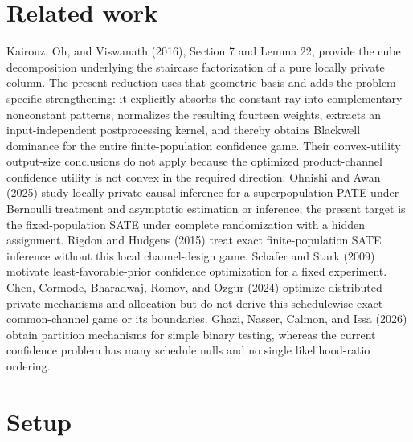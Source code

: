 \documentclass{article}
\begin{document}
\section{Related work}

Kairouz, Oh, and Viswanath (2016), Section 7 and Lemma 22, provide the cube decomposition underlying the staircase factorization of a pure locally private column. The present reduction uses that geometric basis and adds the problem-specific strengthening: it explicitly absorbs the constant ray into complementary nonconstant patterns, normalizes the resulting fourteen weights, extracts an input-independent postprocessing kernel, and thereby obtains Blackwell dominance for the entire finite-population confidence game. Their convex-utility output-size conclusions do not apply because the optimized product-channel confidence utility is not convex in the required direction. Ohnishi and Awan (2025) study locally private causal inference for a superpopulation PATE under Bernoulli treatment and asymptotic estimation or inference; the present target is the fixed-population SATE under complete randomization with a hidden assignment. Rigdon and Hudgens (2015) treat exact finite-population SATE inference without this local channel-design game. Schafer and Stark (2009) motivate least-favorable-prior confidence optimization for a fixed experiment. Chen, Cormode, Bharadwaj, Romov, and Ozgur (2024) optimize distributed-private mechanisms and allocation but do not derive this schedulewise exact common-channel game or its boundaries. Ghazi, Nasser, Calmon, and Issa (2026) obtain partition mechanisms for simple binary testing, whereas the current confidence problem has many schedule nulls and no single likelihood-ratio ordering.

\section{Setup}
\end{document}
